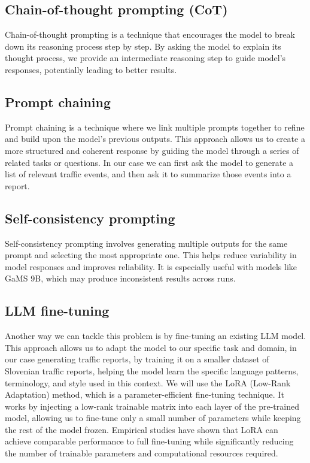 \documentclass[fleqn,moreauthors,10pt]{ds_report}
\begin{document}
\subsection*{Chain-of-thought prompting (CoT)}
Chain-of-thought prompting is a technique that encourages the model to break down its reasoning process step by step.
By asking the model to explain its thought process, we provide an intermediate reasoning step to guide model's responses, potentially leading to better results.



\subsection{Prompt chaining}
Prompt chaining is a technique where we link multiple prompts together to refine and build upon the model's previous outputs.
This approach allows us to create a more structured and coherent response by guiding the model through a series of related tasks or questions.
In our case we can first ask the model to generate a list of relevant traffic events, and then ask it to summarize those events into a report.

\subsection{Self-consistency prompting} Self-consistency prompting involves generating multiple outputs for the same prompt and selecting the most appropriate one. This helps reduce variability in model responses and improves reliability. It is especially useful with models like GaMS 9B, which may produce inconsistent results across runs.

\subsection{LLM fine-tuning}
Another way we can tackle this problem is by fine-tuning an existing LLM model.
This approach allows us to adapt the model to our specific task and domain, in our case generating traffic reports, by training it on a smaller dataset of Slovenian traffic reports, helping the model learn the specific language patterns, terminology, and style used in this context.
We will use the LoRA (Low-Rank Adaptation) method, which is a parameter-efficient fine-tuning technique.
It works by injecting a low-rank trainable matrix into each layer of the pre-trained model, allowing us to fine-tune only a small number of parameters while keeping the rest of the model frozen.
Empirical studies have shown that LoRA can achieve comparable performance to full fine-tuning while significantly reducing the number of trainable parameters and computational resources required.
\end{document}
